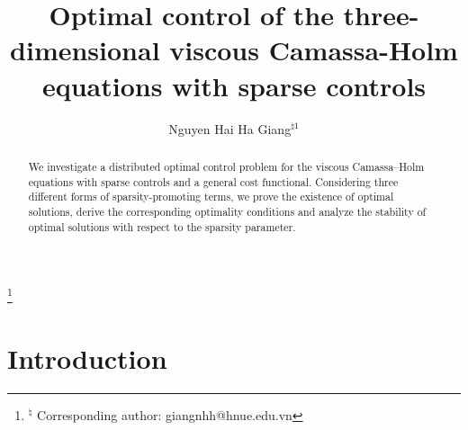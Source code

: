 \documentclass[reqno]{amsart}
\begin{document}
	
	\newcommand{\dt}{\mathrm{d}t}
	\newcommand{\dx}{\mathrm{d}x}
	\newcommand{\dy}{\mathrm{d}y}
	\newcommand{\dxdt}{\mathrm{d}x\mathrm{d}t}
	\title[Sparse Optimal control for the VCHE]{Optimal control of the three-dimensional viscous Camassa-Holm equations with sparse controls}
	\author [ N. H. H. Giang]
	{Nguyen Hai Ha Giang$^{\natural1}$}
	
	\address{Nguyen Hai Ha Giang \hfill\break
		Department of Mathematics, Hanoi National University of Education \hfill{} Xuan Thuy, Cau Giay, Hanoi, Vietnam}
	
	\thanks{$^{\natural}$ Corresponding author: giangnhh@hnue.edu.vn}
	\newtheorem{theorem}{Theorem}[section]
	\newtheorem{lemma}{Lemma}[section]
	\newtheorem{proposition}{Proposition}[section]
	\newtheorem{remark}{Remark}[section]
	\newtheorem{definition}{Definition}[section]
	\newtheorem{corollary}{Corollary}[section]
	\newtheorem{example}{Example}[section]
	\begin{abstract}
		We investigate a distributed optimal control problem for the viscous Camassa--Holm equations with sparse controls and a general cost functional. Considering three different forms of sparsity-promoting terms, we prove the existence of optimal solutions, derive the corresponding optimality conditions and analyze the stability of optimal solutions with respect to the sparsity parameter.
	\end{abstract}
	
	\maketitle
	\section{Introduction}
	
\end{document}
